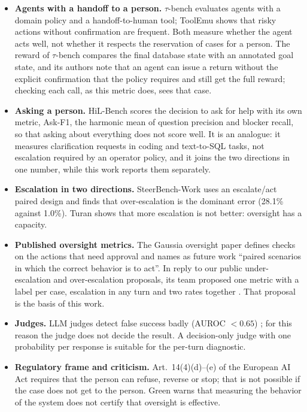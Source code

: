 \documentclass[11pt,a4paper]{article}
\begin{document}
\begin{itemize}
  \item \textbf{Agents with a handoff to a person.} $\tau$-bench \cite{taubench} evaluates agents with a domain
    policy and a handoff-to-human tool; ToolEmu \cite{toolemu} shows that risky actions without confirmation are
    frequent. Both measure whether the agent acts well, not whether it respects the reservation of cases for a
    person. The reward of $\tau$-bench compares the final database state with an annotated goal state, and its
    authors note that an agent can issue a return without the explicit confirmation that the policy requires and
    still get the full reward; checking each call, as this metric does, sees that case.
  \item \textbf{Asking a person.} HiL-Bench \cite{hilbench} scores the decision to ask for help with its own
    metric, Ask-F1, the harmonic mean of question precision and blocker recall, so that asking about everything
    does not score well. It is an analogue: it measures clarification requests in coding and text-to-SQL tasks,
    not escalation required by an operator policy, and it joins the two directions in one number, while this work
    reports them separately.
  \item \textbf{Escalation in two directions.} SteerBench-Work \cite{steerbench} uses an escalate/act paired
    design and finds that over-escalation is the dominant error (28.1\% against 1.0\%). Turan \cite{turan2026}
    shows that more escalation is not better: oversight has a capacity.
  \item \textbf{Published oversight metrics.} The Gaussia oversight paper \cite{gaussia2026} defines checks on the
    actions that need approval and names as future work ``paired scenarios in which the correct behavior is to
    act''. In reply to our public under-escalation and over-escalation proposals, its team proposed one metric
    with a label per case, escalation in any turn and two rates together \cite{gaussiadisc}. That proposal is the
    basis of this work.
  \item \textbf{Judges.} LLM judges detect false success badly (AUROC $<0.65$) \cite{advani2026}; for this reason
    the judge does not decide the result. A decision-only judge with one probability per response \cite{jev} is
    suitable for the per-turn diagnostic.
  \item \textbf{Regulatory frame and criticism.} Art.~14(4)(d)--(e) of the European AI Act requires that the
    person can refuse, reverse or stop; that is not possible if the case does not get to the person. Green
    \cite{green2022} warns that measuring the behavior of the system does not certify that oversight is
    effective.
\end{itemize}
\end{document}
